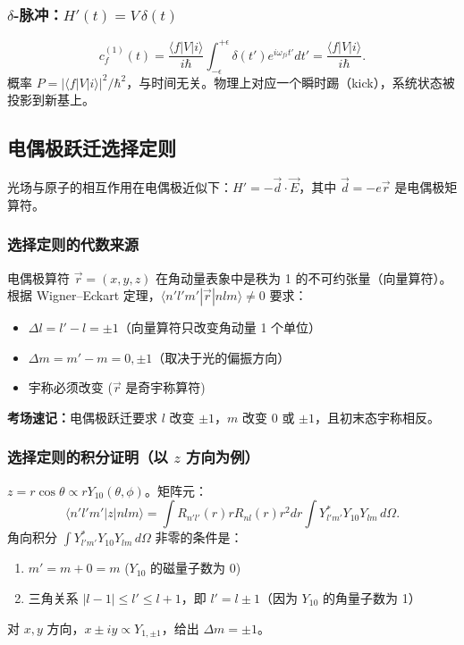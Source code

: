 \begin{derivationbox}[四种典型时间依赖形式]
\subsubsection{$\delta$-脉冲：$H'(t) = V\,\delta(t)$}

\[
c_f^{(1)}(t) = \frac{\langle f|V|i\rangle}{i\hbar} \int_{-\epsilon}^{+\epsilon} \delta(t') e^{i\omega_{fi}t'} dt' = \frac{\langle f|V|i\rangle}{i\hbar}.
\]
概率 $P = |\langle f|V|i\rangle|^2/\hbar^2$，与时间无关。物理上对应一个瞬时踢（kick），系统状态被投影到新基上。
\end{derivationbox}

\subsection{电偶极跃迁选择定则}

\begin{derivationbox}[电偶极跃迁选择定则]
光场与原子的相互作用在电偶极近似下：$H' = -\vec{d}\cdot\vec{E}$，其中 $\vec{d} = -e\vec{r}$ 是电偶极矩算符。

\subsubsection{选择定则的代数来源}

电偶极算符 $\vec{r} = (x,y,z)$ 在角动量表象中是秩为 1 的不可约张量（向量算符）。根据 Wigner--Eckart 定理，$\langle n'l'm'|\vec{r}|nlm\rangle \neq 0$ 要求：
\begin{itemize}
\item $\Delta l = l' - l = \pm 1$（向量算符只改变角动量 1 个单位）
\item $\Delta m = m' - m = 0, \pm 1$（取决于光的偏振方向）
\item 宇称必须改变 ($\vec{r}$ 是奇宇称算符)
\end{itemize}

\textbf{考场速记：}电偶极跃迁要求 $l$ 改变 $\pm 1$，$m$ 改变 $0$ 或 $\pm 1$，且初末态宇称相反。

\subsubsection{选择定则的积分证明（以 $z$ 方向为例）}

$z = r\cos\theta \propto rY_{10}(\theta,\phi)$。矩阵元：
\[
\langle n'l'm'|z|nlm\rangle = \int R_{n'l'}(r) r R_{nl}(r) r^2 dr \int Y_{l'm'}^* Y_{10} Y_{lm} \, d\Omega.
\]
角向积分 $\int Y_{l'm'}^* Y_{10} Y_{lm} \, d\Omega$ 非零的条件是：
\begin{enumerate}
\item $m' = m + 0 = m$ ($Y_{10}$ 的磁量子数为 0)
\item 三角关系 $|l-1| \leq l' \leq l+1$，即 $l' = l \pm 1$（因为 $Y_{10}$ 的角量子数为 1）
\end{enumerate}
对 $x,y$ 方向，$x \pm iy \propto Y_{1,\pm 1}$，给出 $\Delta m = \pm 1$。
\end{derivationbox}
